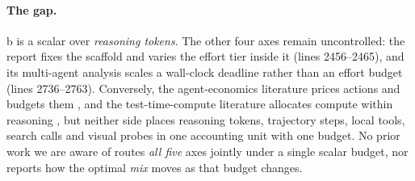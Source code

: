 \documentclass[10pt]{article} %
\newcommand{\eff}{b}
\begin{document}
\paragraph{The gap.}
\eff{} is a scalar over \emph{reasoning tokens}. The other four axes remain
uncontrolled: the report fixes the scaffold and varies the effort tier inside it
(lines 2456--2465), and its multi-agent analysis scales a wall-clock deadline
rather than an effort budget (lines 2736--2763). Conversely, the agent-economics
literature prices actions and budgets them
\citep{wu2026ecoagentbench,liu2025budgettooluse}, and the test-time-compute
literature allocates compute within reasoning
\citep{zhou2026coba,yang2026gambit,alomrani2025reasoningbudget}, but neither side
places reasoning tokens, trajectory steps, local tools, search calls and visual
probes in one accounting unit with one budget. No prior work we are aware of
routes \emph{all five} axes jointly under a single scalar budget, nor reports how
the optimal \emph{mix} moves as that budget changes.
\end{document}
